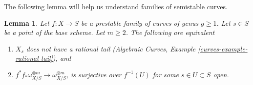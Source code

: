 \documentclass{stacks-project}
\theoremstyle{plain}
\newtheorem{lemma}[subsection]{Lemma}
\theoremstyle{definition}
\theoremstyle{remark}
\numberwithin{equation}{subsection}
\begin{document}
\noindent
The following lemma will help us understand families of semistable curves.

\begin{lemma}
\label{lemma-semistable}
Let $f : X \to S$ be a prestable family of curves of genus $g \geq 1$.
Let $s \in S$ be a point of the base scheme. Let $m \geq 2$.
The following are equivalent
\begin{enumerate}
\item $X_s$ does not have a rational tail
(Algebraic Curves, Example \ref{curves-example-rational-tail}), and
\item $f^*f_*\omega_{X/S}^{\otimes m} \to \omega_{X/S}^{\otimes m}$,
is surjective over $f^{-1}(U)$ for some $s \in U \subset S$ open.
\end{enumerate}
\end{lemma}
\end{document}
